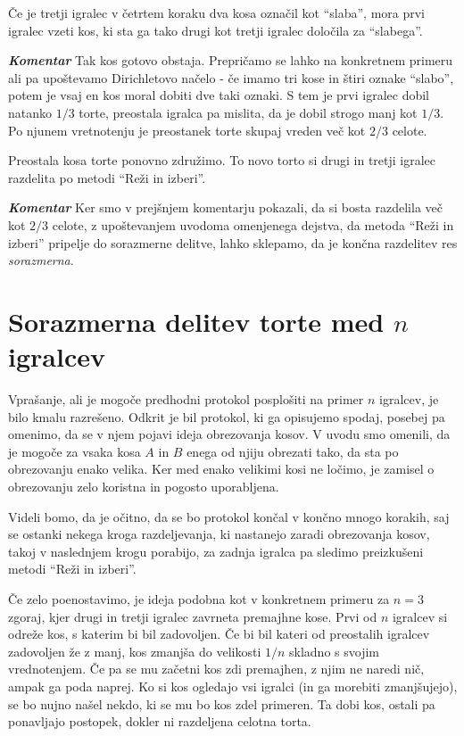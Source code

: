 \documentclass[a4paper,12pt]{article}
\begin{document}
\begin{protokol}
\item Če je tretji igralec v četrtem koraku dva kosa označil kot ``slaba'', mora prvi igralec vzeti kos, ki sta ga tako drugi kot tretji igralec določila za ``slabega''.

\item [\textbf{\em Komentar}]Tak kos gotovo obstaja. Prepričamo se lahko na konkretnem primeru ali pa upoštevamo Dirichletovo načelo - če imamo tri kose in štiri oznake ``slabo'', potem je vsaj en kos moral dobiti dve taki oznaki. S tem je prvi igralec dobil natanko $1/3$ torte, preostala igralca pa mislita, da je dobil strogo manj kot $1/3$. Po njunem vretnotenju je preostanek torte skupaj vreden več kot $2/3$ celote.

\item Preostala kosa torte ponovno združimo. To novo torto si drugi in tretji igralec razdelita po metodi ``Reži in izberi''.

\item [\textbf{\em Komentar}] Ker smo v prejšnjem komentarju pokazali, da si bosta razdelila več kot $2/3$ celote, z upoštevanjem uvodoma omenjenega dejstva, da metoda ``Reži in izberi'' pripelje do sorazmerne delitve, lahko sklepamo, da je končna razdelitev res  {\em sorazmerna}.

\end{protokol}

\section{Sorazmerna delitev torte med $n$ igralcev}

Vprašanje, ali je mogoče predhodni protokol posplošiti na primer $n$ igralcev, je bilo kmalu razrešeno. Odkrit je bil protokol, ki ga opisujemo spodaj, posebej pa omenimo, da se v njem pojavi ideja obrezovanja kosov. V uvodu smo omenili, da je mogoče za vsaka kosa $A$ in $B$ enega od njiju obrezati tako, da sta po obrezovanju enako velika. Ker med enako velikimi kosi ne ločimo, je zamisel o obrezovanju zelo koristna in pogosto uporabljena. 

Videli bomo, da je očitno, da se bo protokol končal v končno mnogo korakih, saj se ostanki nekega kroga razdeljevanja, ki nastanejo zaradi obrezovanja kosov, takoj v naslednjem krogu porabijo, za zadnja igralca pa sledimo preizkušeni metodi ``Reži in izberi''. 

Če zelo poenostavimo, je ideja podobna kot v konkretnem primeru za $n = 3$ zgoraj, kjer drugi in tretji igralec zavrneta premajhne kose. Prvi od $n$ igralcev si odreže kos, s katerim bi bil zadovoljen. Če bi bil kateri od preostalih igralcev zadovoljen že z manj, kos zmanjša do velikosti $1/n$ skladno s svojim vrednotenjem. Če pa se mu začetni kos zdi premajhen, z njim ne naredi nič, ampak ga poda naprej. Ko si kos ogledajo vsi igralci (in ga morebiti zmanjšujejo), se bo nujno našel nekdo, ki se mu bo kos zdel primeren. Ta dobi kos, ostali pa ponavljajo postopek, dokler ni razdeljena celotna torta.
\end{document}
